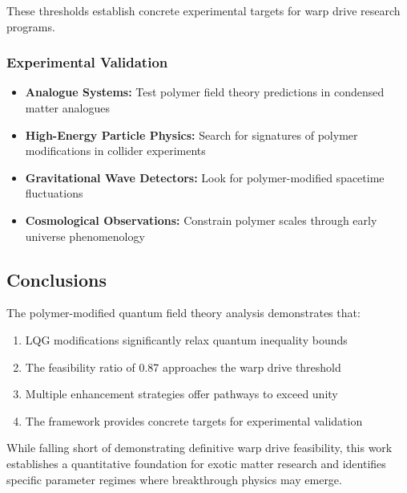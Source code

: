 \documentclass[11pt]{article}
\begin{document}
These thresholds establish concrete experimental targets for warp drive research programs.

\subsubsection*{Experimental Validation}
\begin{itemize}
  \item \textbf{Analogue Systems:} Test polymer field theory predictions in condensed matter analogues
  \item \textbf{High-Energy Particle Physics:} Search for signatures of polymer modifications in collider experiments  
  \item \textbf{Gravitational Wave Detectors:} Look for polymer-modified spacetime fluctuations
  \item \textbf{Cosmological Observations:} Constrain polymer scales through early universe phenomenology
\end{itemize}

\subsection*{Conclusions}
The polymer-modified quantum field theory analysis demonstrates that:
\begin{enumerate}
  \item LQG modifications significantly relax quantum inequality bounds
  \item The feasibility ratio of 0.87 approaches the warp drive threshold
  \item Multiple enhancement strategies offer pathways to exceed unity
  \item The framework provides concrete targets for experimental validation
\end{enumerate}

While falling short of demonstrating definitive warp drive feasibility, this work establishes a quantitative foundation for exotic matter research and identifies specific parameter regimes where breakthrough physics may emerge.
\end{document}
